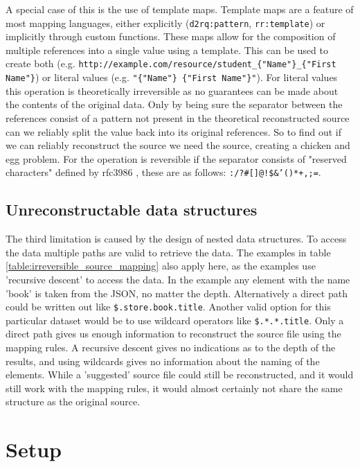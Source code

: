 A special case of this is the use of template maps. Template maps are a feature of most mapping languages, either explicitly (\texttt{d2rq:pattern}, \texttt{rr:template}) or implicitly through custom functions. These maps allow for the composition of multiple references into a single value using a template. This can be used to create both  (e.g. \texttt{http://example.com/resource/student\_\{"Name"\}\_\{"First Name"\}}) or literal values (e.g. \texttt{"\{"Name"\} \{"First Name"\}"}). For literal values this operation is theoretically irreversible as no guarantees can be made about the contents of the original data. Only by being sure the separator between the references consist of a pattern not present in the theoretical reconstructed source can we reliably split the value back into its original references. So to find out if we can reliably reconstruct the source we need the source, creating a chicken and egg problem. For  the operation is reversible if the separator consists of "reserved characters" defined by rfc3986 \citep{rfc3986}, these are as follows: \texttt{:/?\#[]@!\$\&'()*+,;=}.

\subsection{Unreconstructable data structures}
The third limitation is caused by the design of nested data structures. To access the data multiple paths are valid to retrieve the data. The examples in table \ref{table:irreversible_source_mapping} also apply here, as the examples use 'recursive descent' to access the data. In the example any element with the name 'book' is taken from the JSON, no matter the depth. Alternatively a direct path could be written out like \texttt{\$.store.book.title}. Another valid option for this particular dataset would be to use wildcard operators like \texttt{\$.*.*.title}. Only a direct path gives us enough information to reconstruct the source file using the mapping rules. A recursive descent gives no indications as to the depth of the results, and using wildcards gives no information about the naming of the elements. While a 'suggested' source file could still be reconstructed, and it would still work with the mapping rules, it would almost certainly not share the same structure as the original source.

\section{Setup}

